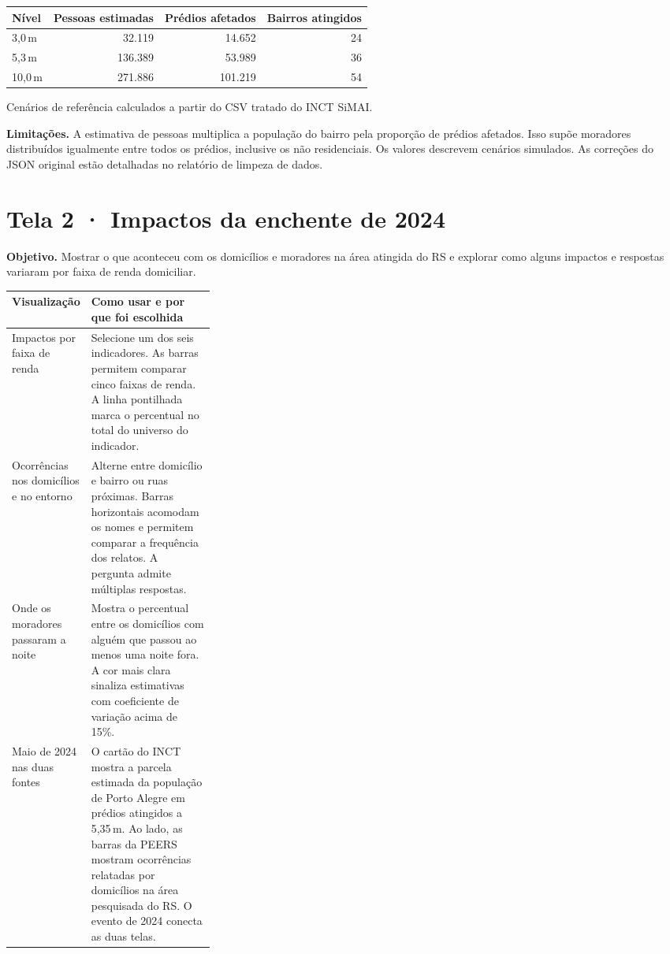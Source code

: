 \documentclass[11pt,a4paper]{article}
\begin{document}
\begin{center}
\small
\begin{tabular}{@{}lrrr@{}}
\toprule
\textbf{Nível} & \textbf{Pessoas estimadas} & \textbf{Prédios afetados} & \textbf{Bairros atingidos}\\
\midrule
3,0\,m & 32.119 & 14.652 & 24\\
5,3\,m & 136.389 & 53.989 & 36\\
10,0\,m & 271.886 & 101.219 & 54\\
\bottomrule
\end{tabular}
\end{center}
{\small\color{cinza} Cenários de referência calculados a partir do CSV tratado do INCT SiMAI.}

\textbf{Limitações.} A estimativa de pessoas multiplica a população do bairro
pela proporção de prédios afetados. Isso supõe moradores distribuídos igualmente
entre todos os prédios, inclusive os não residenciais. Os valores descrevem
cenários simulados. As correções do JSON original estão detalhadas no relatório de
limpeza de dados.

\newpage
\section*{\color{azul}Tela 2 · Impactos da enchente de 2024}
\textbf{Objetivo.} Mostrar o que aconteceu com os domicílios e moradores na área
atingida do RS e explorar como alguns impactos e respostas variaram por faixa de
renda domiciliar.

\begin{tabularx}{\linewidth}{@{}p{0.30\linewidth}X@{}}
\toprule
\textbf{Visualização} & \textbf{Como usar e por que foi escolhida}\\
\midrule
Impactos por faixa de renda &
Selecione um dos seis indicadores. As barras permitem comparar cinco faixas de renda.
A linha pontilhada marca o percentual no total do universo do indicador.\\
\addlinespace
Ocorrências nos domicílios e no entorno &
Alterne entre domicílio e bairro ou ruas próximas. Barras horizontais acomodam os
nomes e permitem comparar a frequência dos relatos. A pergunta admite múltiplas respostas.\\
\addlinespace
Onde os moradores passaram a noite &
Mostra o percentual entre os domicílios com alguém que passou ao menos uma noite fora.
A cor mais clara sinaliza estimativas com coeficiente de variação acima de 15\%.\\
\addlinespace
Maio de 2024 nas duas fontes &
O cartão do INCT mostra a parcela estimada da população de Porto Alegre em prédios
atingidos a 5,35\,m. Ao lado, as barras da PEERS mostram ocorrências relatadas
por domicílios na área pesquisada do RS. O evento de 2024 conecta as duas telas.\\
\bottomrule
\end{tabularx}
\end{document}
